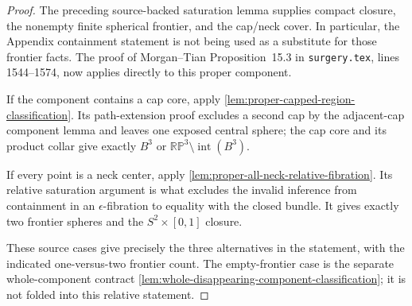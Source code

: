 \begin{proof}
The preceding source-backed saturation lemma supplies compact closure, the
nonempty finite spherical frontier, and the cap/neck cover.  In particular, the
Appendix containment statement is not being used as a substitute for those
frontier facts.  The proof of Morgan--Tian Proposition~15.3 in
\texttt{surgery.tex}, lines 1544--1574, now applies directly to this proper
component.

If the component contains a cap core, apply
\ref{lem:proper-capped-region-classification}.  Its path-extension proof
excludes a second cap by the adjacent-cap component lemma and leaves one
exposed central sphere; the cap core and its product collar give exactly
$B^3$ or $\mathbb{RP}^3\setminus\operatorname{int}(B^3)$.

  If every point is a neck center, apply
  \ref{lem:proper-all-neck-relative-fibration}.  Its relative saturation
  argument is what excludes the invalid inference from containment in an
  $\epsilon$-fibration to equality with the closed bundle.  It gives exactly
  two frontier spheres and the $S^2\times[0,1]$ closure.

These source cases give precisely the three alternatives in the statement,
with the indicated one-versus-two frontier count.  The empty-frontier case is
the separate whole-component contract
\ref{lem:whole-disappearing-component-classification}; it is not folded into
this relative statement.
\end{proof}

